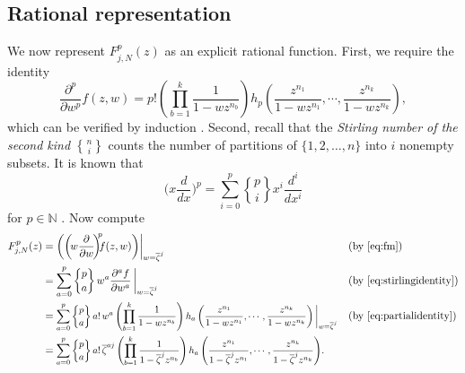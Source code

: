 \documentclass[10pt,reqno]{amsart}
\newcommand{\NN}{\mathbb{N}}
\newcommand{\0}{\color{lightgray}0}
\newcommand{\stirling}[2]{\genfrac\{\}{0pt}{}{#1}{#2}}
\renewcommand\>{\rangle}
\newcommand\<{\langle}
\theoremstyle{plain}
\theoremstyle{definition}
\begin{document}
\subsection{Rational representation}\label{subsection:rational}
We now represent $F^p_{j,N}(z)$ as an explicit rational function.
First, we require the identity
\begin{equation}\label{eq:partialidentity}
\frac{\partial^p}{\partial w^p} f(z,w)
= p! \left( \prod_{b=1}^k \frac{1}{1 - wz^{n_b}} \right) h_p \left( \frac{z^{n_1}}{1 - wz^{n_1}}, \cdots, \frac{z^{n_k}}{1 - wz^{n_k}} \right),
\end{equation}
which can be verified by induction \cite[Lem.~22]{GOOY}.  Second, recall that
the \emph{Stirling number of the second kind} $\stirling{n}{i}$ counts the number of partitions of 
$\{1, 2, \ldots, n\}$ into $i$ nonempty subsets. It is known that
\begin{equation}\label{eq:stirlingidentity}
\bigg(x \frac{d}{dx}\bigg)^{\!p}
= \sum_{i=0}^p \stirling{p}{i} x^i \frac{d^i}{dx^i}
\end{equation}
for $p \in \NN$ \cite{Carlitz1, Carlitz2, Toscano}.
Now compute
\begin{align}
F^p_{j,N}(z)
&= \bigg(  \bigg( \! w \frac{\partial}{\partial w} \! \bigg)^{\!\!p} \!\! f(z,w) \bigg) \bigg |_{w=\overline{\zeta}^j} && \text{(by \eqref{eq:fm})}\nonumber\\
&= \sum_{a=0}^p \stirling{p}{a} \, w^a \frac{\partial^a f}{\partial w^a} \, \bigg |_{w=\overline{\zeta}^j} \nonumber && \text{(by \eqref{eq:stirlingidentity})} \\
&= \scalebox{0.9}{$\displaystyle\sum_{a=0}^p \stirling{p}{a} \, a! \, w^a \left( \prod_{b=1}^k \frac{1}{1 - wz^{n_b}} \right) h_a \left( \frac{z^{n_1}}{1 - wz^{n_1}}, \cdots, \frac{z^{n_k}}{1 - wz^{n_k}} \right) \bigg |_{w=\overline{\zeta}^j}$} && \text{(by \eqref{eq:partialidentity})} \nonumber \\
&=  \scalebox{0.9}{$\displaystyle\sum_{a=0}^p \stirling{p}{a} \, a! \,\overline{\zeta}^{aj}
\left( \prod_{b=1}^k \frac{1}{1 - \overline{\zeta}^j z^{n_b}}  \right) h_a \left( \frac{z^{n_1}}{1 - \overline{\zeta}^j z^{n_1}}, \cdots, \frac{z^{n_k}}{1 - \overline{\zeta}^j z^{n_k}} \right)$}.\nonumber
\end{align}

 
\end{document}

